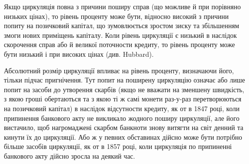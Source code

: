 Якщо циркуляція повна з причини поширу справ (що можливе й при порівняно
низьких цінах), то рівень проценту може бути, відносно високий з причини
попиту на позичковий капітал, що зумовлюється зростом зиску та збільшенням
змоги нових приміщень капіталу. Коли рівень циркуляції є низький в наслідок
скорочення справ або й великої поточности кредиту, то рівень проценту може бути
низький і при високих цінах (див. Hubbard).

Абсолютний розмір циркуляції впливає на рівень проценту, визначаючи
його, тільки підчас пригнічення. Тут попит на поширену циркуляцію означає
або лише попит на засоби до утворення скарбів (якщо не вважати на зменшену
швидкість, з якою гроші обертаються та з якою ті ж самі монети раз-у-раз
перетворюються на позичковий капітал) в наслідок відсутности кредиту, як от
в 1847 році, коли припинення банкового акту не викликало жодного поширу
циркуляції, але його вистачило, щоб нагромаджені скарбом банкноти знову
витягти на світ денний та кинути їх до циркуляції. Або ж у певних обставинах
дійсно може бути потрібно більше засобів циркуляції, як от в 1857 році, коли
циркуляція по припиненні банкового акту дійсно зросла на деякий час.
